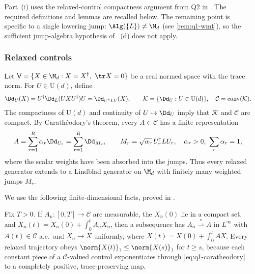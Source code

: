 \documentclass[class=article,11pt,a4paper,crop=false]{standalone}
\begin{document}
Part~(i) uses the relaxed-control compactness argument from Q2 in
. The required definitions and lemmas
are recalled below. The remaining point is specific to a single lowering
jump: $\Alg(\{L\})\ne\M_d$ (see \cref{rem:q1-wmt}), so the sufficient
jump-algebra hypothesis of \cite{Wolff2026Contractivity}~(d) does not apply.

\subsubsection*{Relaxed controls}

Let
$\mathsf V=\{X\in\M_d:X=X^\dagger,\ \tr X=0\}$ be a real normed space with
the trace norm. For $U\in\mathrm U(d)$, define
\begin{equation}
	\Dd_U(X)=U^\dagger\Dd_L(UXU^\dagger)U=\Dd_{U^\dagger LU}(X),
	\qquad
	\mathcal K=\{\Dd_U:U\in\mathrm U(d)\},\quad
	\mathcal C=\operatorname{conv}(\mathcal K).
	\label{eq:q1-control-sets}
\end{equation}
The compactness of $\mathrm U(d)$ and continuity of $U\mapsto\Dd_U$ imply
that $\mathcal K$ and $\mathcal C$ are compact. By Carath\'eodory's theorem,
every $A\in\mathcal C$ has a finite representation
\begin{equation}
	A=\sum_{r=1}^R\alpha_r\Dd_{U_r}
	=\sum_{r=1}^R\Dd_{M_r},
	\qquad M_r=\sqrt{\alpha_r}\,U_r^\dagger LU_r,\quad
	\alpha_r>0,\ \sum_r\alpha_r=1,
	\label{eq:q1-caratheodory}
\end{equation}
where the scalar weights have been absorbed into the jumps. Thus every
relaxed generator extends to a Lindblad generator on $\M_d$ with finitely many
weighted jumps $M_r$.

We use the following finite-dimensional facts, proved in
.

\begin{lemma}
	\label{lem:q1-relaxed-compactness}
	Fix $T>0$. If $A_n:[0,T]\to\mathcal C$ are measurable, the $X_n(0)$ lie in a
	compact set, and $X_n(t)=X_n(0)+\int_0^tA_n X_n$, then a subsequence has
	$A_n\stackrel{*}{\rightharpoonup}A$ in $L^\infty$ with
	$A(t)\in\mathcal C$ a.e.\ and $X_n\to X$ uniformly, where
	$X(t)=X(0)+\int_0^tAX$. Every relaxed trajectory obeys
	$\norm{X(t)}_1\le\norm{X(s)}_1$ for $t\ge s$, because each constant piece of
	a $\mathcal C$-valued control exponentiates through
	\eqref{eq:q1-caratheodory} to a completely positive, trace-preserving map.
\end{lemma}
\end{document}
